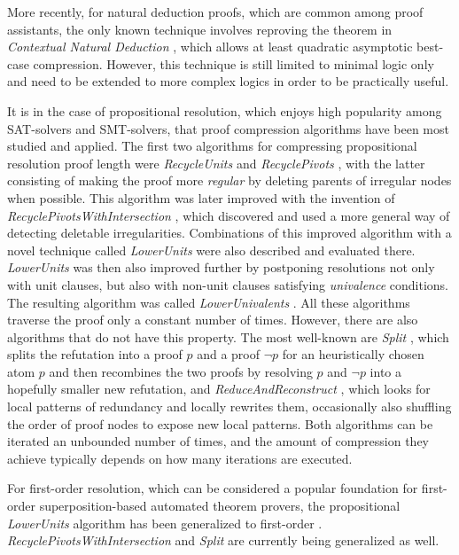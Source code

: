 More recently, for natural deduction proofs, which are common among proof assistants, the only known technique involves reproving the theorem in \emph{Contextual Natural Deduction} \cite{DBLP:conf/lfcs/Paleo13,DBLP:conf/ershov/Paleo15}, which allows at least quadratic asymptotic best-case compression. However, this technique is still limited to minimal logic only and need to be extended to more complex logics in order to be practically useful.

It is in the case of propositional resolution, which enjoys high popularity among SAT-solvers and SMT-solvers, that proof compression algorithms have been most studied and applied. The first two algorithms for compressing propositional resolution proof length were \emph{RecycleUnits} and \emph{RecyclePivots} \cite{Bar-Ilan2008}, with the latter consisting of making the proof more \emph{regular} by deleting parents of irregular nodes when possible. This algorithm was later improved with the invention of \emph{RecyclePivotsWithIntersection} \cite{Fontaine2011}, which discovered and used a more general way of detecting deletable irregularities. Combinations of this improved algorithm with a novel technique called \emph{LowerUnits} \cite{Fontaine2011} were also described and evaluated there. \emph{LowerUnits} was then also improved further by postponing resolutions not only with unit clauses, but also with non-unit clauses satisfying \emph{univalence} conditions. The resulting algorithm was called \emph{LowerUnivalents} \cite{DBLP:conf/tableaux/BoudouP13}. All these algorithms traverse the proof only a constant number of times. However, there are also algorithms that do not have this property. The most well-known are \emph{Split} \cite{cotton2010two}, which splits the refutation into a proof $p$ and a proof $\neg p$ for an heuristically chosen atom $p$ and then recombines the two proofs by resolving $p$ and $\neg p$ into a hopefully smaller new refutation, and \emph{ReduceAndReconstruct} \cite{DBLP:conf/hvc/RolliniBS10}, which looks for local patterns of redundancy and locally rewrites them, occasionally also shuffling the order of proof nodes to expose new local patterns. Both algorithms can be iterated an unbounded number of times, and the amount of compression they achieve typically depends on how many iterations are executed.

For first-order resolution, which can be considered a popular foundation for first-order superposition-based automated theorem provers, the propositional \emph{LowerUnits} algorithm has been generalized to first-order \cite{DBLP:conf/cade/GorznyP15}. \emph{RecyclePivotsWithIntersection} and \emph{Split} are currently being generalized as well.


